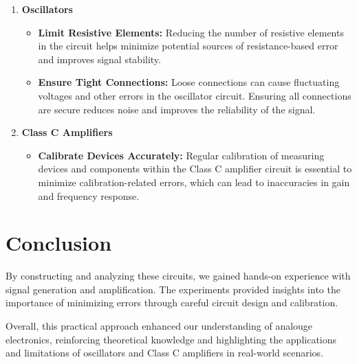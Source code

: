 \documentclass[12pt,a4paper]{article}
\begin{document}
    \begin{enumerate}
        \item \textbf{Oscillators}
        \begin{itemize}
            \item \textbf{Limit Resistive Elements:} Reducing the number of resistive elements in the circuit helps minimize potential sources of resistance-based error and improves signal stability.
            \item \textbf{Ensure Tight Connections:} Loose connections can cause fluctuating voltages and other errors in the oscillator circuit. Ensuring all connections are secure reduces noise and improves the reliability of the signal.
        \end{itemize}
        
        \item \textbf{Class C Amplifiers}
        \begin{itemize}
            \item \textbf{Calibrate Devices Accurately:} Regular calibration of measuring devices and components within the Class C amplifier circuit is essential to minimize calibration-related errors, which can lead to inaccuracies in gain and frequency response.
        \end{itemize}
    \end{enumerate}

    \section{Conclusion}

    By constructing and analyzing these circuits, we gained hands-on experience with signal generation and amplification. The experiments provided insights into the importance of minimizing errors through careful circuit design and calibration.

    Overall, this practical approach enhanced our understanding of analouge electronics, reinforcing theoretical knowledge and highlighting the applications and limitations of oscillators and Class C amplifiers in real-world scenarios.

    \nocite{*}
    
    
\end{document}
